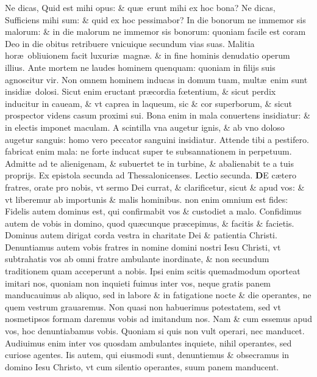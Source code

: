 \documentclass[a5paper,10pt]{book}
\def\leftmarginnote{%
	\lrmarginnote{\hskip -\marginparsep \hskip -6.5em}}
\def\ae{æ}
\def\oe{œ}
\begin{document}
\begin{multicols*}{2}
Ne dicas, Quid est mihi opus: \& qu\ae \ erunt mihi ex hoc bona? Ne dicas, Sufficiens mihi sum: \& quid ex hoc pessimabor?
In die bonorum ne immemor sis malorum: \& in die malorum ne immemor sis bonorum: quoniam facile est coram Deo in die obitus retribuere vnicuique secundum vias suas.
Malitia hor\ae \ obliuionem facit luxuri\ae \ magn\ae . \& in fine hominis denudatio operum illius. Ante mortem ne laudes hominem quenquam: quoniam in filijs suis agnoscitur vir.
Non omnem hominem inducas in domum tuam, mult\ae \ enim sunt insidi\ae \ dolosi. Sicut enim eructant pr\ae cordia f\oe tentium, \& sicut perdix inducitur in caueam, \& vt caprea in laqueum, sic \& cor superborum, \& sicut prospector videns casum proximi sui.
Bona enim in mala conuertens insidiatur: \& in electis imponet maculam. A scintilla vna augetur ignis, \& ab vno doloso augetur sanguis: homo vero peccator sanguini insidiatur.
Attende tibi a pestifero. fabricat enim mala: ne forte inducat super te subsannationem in perpetuum. Admitte ad te alienigenam,
\& subuertet te in turbine, \& abalienabit te a tuis proprijs.
\newline {} \color{red} Ex epistola secunda ad Thessalonicenses. \quad Lectio secunda. \color{black}
\vspace{-1.25em}
\lettrine[lines=2]{\bfseries \color{red} D}{}E\leftmarginnote{\begin{flushright}ca. 3.\end{flushright}} c\ae tero fratres, orate pro nobis, vt sermo Dei currat, \& clarificetur, sicut \& apud vos: \& vt liberemur ab importunis \& malis hominibus. non enim omnium est fides: Fidelis autem dominus est, qui confirmabit vos \& custodiet a malo.
Confidimus autem de vobis in domino, quod qu\ae cunque pr\ae cepimus, \& facitis \& facietis. Dominus autem dirigat corda vestra in charitate Dei \& patientia Christi.
Denuntiamus autem vobis fratres in nomine domini nostri Iesu Christi, vt subtrahatis vos ab omni fratre ambulante inordinate, \& non secundum traditionem quam acceperunt a nobis.
Ipsi enim scitis quemadmodum oporteat imitari nos, quoniam non inquieti fuimus inter vos, neque gratis panem manducauimus ab aliquo, sed in labore \& in fatigatione nocte \& die operantes, ne quem vestrum grauaremus.
Non quasi non habuerimus potestatem, sed vt nosmetipsos formam daremus vobis ad imitandum nos. Nam \& cum essemus apud vos, hoc denuntiabamus vobis. Quoniam si quis non vult operari, nec manducet.
Audiuimus enim inter vos quosdam ambulantes inquiete, nihil operantes, sed curiose agentes. Iis autem, qui eiusmodi sunt, denuntiemus \& obsecramus in domino Iesu Christo, vt cum silentio operantes, suum panem manducent.

\end{multicols*}
\end{document}
